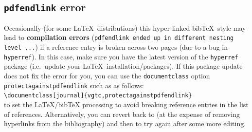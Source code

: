 \documentclass[journal]{vgtc}                     %
\begin{document}
\subsection{\texttt{pdfendlink} error}

Occasionally (for some \LaTeX\ distributions) this hyper-linked bib\TeX\ style may lead to \textbf{compilation errors} (\texttt{pdfendlink ended up in different nesting level ...}) if a reference entry is broken across two pages (due to a bug in \verb|hyperref|).
In this case, make sure you have the latest version of the \verb|hyperref| package (i.e.\ update your \LaTeX\ installation/packages).
If this package update does not fix the error for you, you can use the \verb|documentclass| option \verb|protectagainstpdfendlink| such as as follows:\\[1ex]
{\footnotesize\verb|\documentclass[journal]{vgtc,protectagainstpdfendlink}|}\\[1ex]
to set the \LaTeX/bib\TeX{} processing to avoid breaking reference entries in the list of references. Alternatively, you can revert back to \verb|| (at the expense of removing hyperlinks from the bibliography) and then to try \verb|| again after some more editing.
\end{document}
